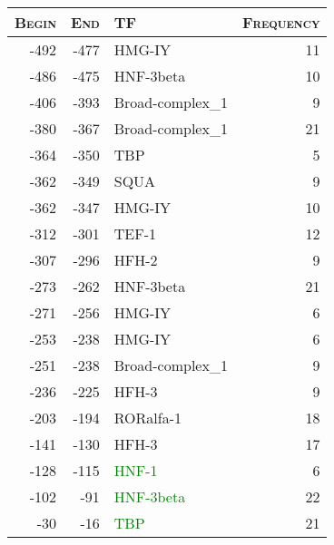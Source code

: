 \documentclass{article}
\begin{document}
\begin{center}

\noindent\begin{minipage}{\linewidth}%
\begin{center}%
\begin{tabular}{|>{\scshape}r|r|l|r|}
\rowcolor[gray]{0.9}
\hline
\bfseries \scshape Begin & \bfseries \scshape End & \bfseries \scshape TF & \bfseries \scshape Frequency\\
\hline
-492 & -477 & HMG-IY & 11\\
-486 & -475 & HNF-3beta & 10\\
\hline
-406 & -393 & Broad-complex\_1 & 9\\
\hline
-380 & -367 & Broad-complex\_1 & 21\\
\hline
-364 & -350 & TBP & 5\\
-362 & -349 & SQUA & 9\\
-362 & -347 & HMG-IY & 10\\
\hline
-312 & -301 & TEF-1 & 12\\
-307 & -296 & HFH-2 & 9\\
\hline
-273 & -262 & HNF-3beta & 21\\
-271 & -256 & HMG-IY & 6\\
\hline
-253 & -238 & HMG-IY & 6\\
-251 & -238 & Broad-complex\_1 & 9\\
\hline
-236 & -225 & HFH-3 & 9\\
\hline
-203 & -194 & RORalfa-1 & 18\\
\hline
-141 & -130 & HFH-3 & 17\\
\hline
-128 & -115 & \textcolor{green}{HNF-1} & 6\\
\hline
-102 & -91 & \textcolor{green}{HNF-3beta} & 22\\
\hline
-30 & -16 & \textcolor{green}{TBP} & 21\\
\hline
\end{tabular}
\end{center}%
\end{minipage}%
\end{center}%
\end{document}
